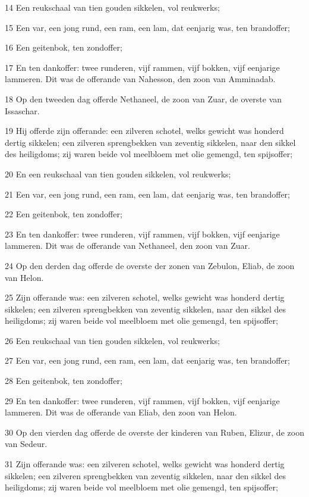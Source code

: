\par 14 Een reukschaal van tien gouden sikkelen, vol reukwerks;
\par 15 Een var, een jong rund, een ram, een lam, dat eenjarig was, ten brandoffer;
\par 16 Een geitenbok, ten zondoffer;
\par 17 En ten dankoffer: twee runderen, vijf rammen, vijf bokken, vijf eenjarige lammeren. Dit was de offerande van Nahesson, den zoon van Amminadab.
\par 18 Op den tweeden dag offerde Nethaneel, de zoon van Zuar, de overste van Issaschar.
\par 19 Hij offerde zijn offerande: een zilveren schotel, welks gewicht was honderd dertig sikkelen; een zilveren sprengbekken van zeventig sikkelen, naar den sikkel des heiligdoms; zij waren beide vol meelbloem met olie gemengd, ten spijsoffer;
\par 20 En een reukschaal van tien gouden sikkelen, vol reukwerks;
\par 21 Een var, een jong rund, een ram, een lam, dat eenjarig was, ten brandoffer;
\par 22 Een geitenbok, ten zondoffer;
\par 23 En ten dankoffer: twee runderen, vijf rammen, vijf bokken, vijf eenjarige lammeren. Dit was de offerande van Nethaneel, den zoon van Zuar.
\par 24 Op den derden dag offerde de overste der zonen van Zebulon, Eliab, de zoon van Helon.
\par 25 Zijn offerande was: een zilveren schotel, welks gewicht was honderd dertig sikkelen; een zilveren sprengbekken van zeventig sikkelen, naar den sikkel des heiligdoms; zij waren beide vol meelbloem met olie gemengd, ten spijsoffer;
\par 26 Een reukschaal van tien gouden sikkelen, vol reukwerks;
\par 27 Een var, een jong rund, een ram, een lam, dat eenjarig was, ten brandoffer;
\par 28 Een geitenbok, ten zondoffer;
\par 29 En ten dankoffer: twee runderen, vijf rammen, vijf bokken, vijf eenjarige lammeren. Dit was de offerande van Eliab, den zoon van Helon.
\par 30 Op den vierden dag offerde de overste der kinderen van Ruben, Elizur, de zoon van Sedeur.
\par 31 Zijn offerande was: een zilveren schotel, welks gewicht was honderd dertig sikkelen; een zilveren sprengbekken van zeventig sikkelen, naar den sikkel des heiligdoms; zij waren beide vol meelbloem met olie gemengd, ten spijsoffer;
